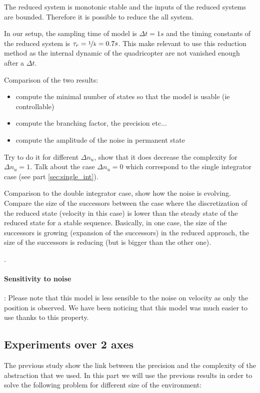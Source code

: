 The reduced system is monotonic stable and the inputs of the reduced systems are bounded. Therefore it is possible to reduce the all system.

In our setup, the sampling time of model is ${\Delta t = 1s}$ and the timing constants of the reduced system is $\tau_r = {\nicefrac{1}{k} = 0.7s}$. This make relevant to use this reduction method as the internal dynamic of the quadricopter are not vanished enough after a $\Delta t$.


Comparison of the two results:
\begin{itemize}
\item compute the minimal number of states so that the model is usable (ie controllable)
\item compute the branching factor, the precision etc...
\item compute the amplitude of the noise in permanent state
\end{itemize}

Try to do it for different $\Delta n_u$, show that it does decrease the complexity for $\Delta n_u = 1$. Talk about the case $\Delta n_u = 0$ which correspond to the single integrator case (see part \ref{sec:single_int}).

Comparison to the double integrator case, show how the noise is evolving. Compare the size of the successors between the case where the discretization of the reduced state (velocity in this case) is lower than the steady state of the reduced state for a stable sequence. Basically, in one case, the size of the successors is growing (expansion of the successors) in the reduced approach, the size of the successors is reducing (but is bigger than the other one).


.

\paragraph{Sensitivity to noise}:
Please note that this model is less sensible to the noise on velocity as only the position is observed.
We have been noticing that this model was much easier to use thanks to this property.

\subsection{Experiments over 2 axes}

The previous study show the link between the precision and the complexity of the abstraction that we used.
In this part we will use the previous results in order to solve the following problem for different size of the environment:

